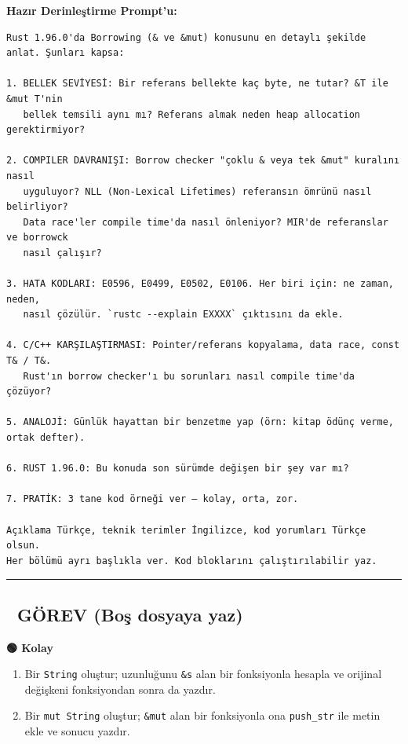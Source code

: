 \documentclass[12pt,a4paper]{article}
\begin{document}
\textbf{Hazır Derinleştirme Prompt'u:}

\begin{verbatim}
Rust 1.96.0'da Borrowing (& ve &mut) konusunu en detaylı şekilde anlat. Şunları kapsa:

1. BELLEK SEVİYESİ: Bir referans bellekte kaç byte, ne tutar? &T ile &mut T'nin
   bellek temsili aynı mı? Referans almak neden heap allocation gerektirmiyor?

2. COMPILER DAVRANIŞI: Borrow checker "çoklu & veya tek &mut" kuralını nasıl
   uyguluyor? NLL (Non-Lexical Lifetimes) referansın ömrünü nasıl belirliyor?
   Data race'ler compile time'da nasıl önleniyor? MIR'de referanslar ve borrowck
   nasıl çalışır?

3. HATA KODLARI: E0596, E0499, E0502, E0106. Her biri için: ne zaman, neden,
   nasıl çözülür. `rustc --explain EXXXX` çıktısını da ekle.

4. C/C++ KARŞILAŞTIRMASI: Pointer/referans kopyalama, data race, const T& / T&.
   Rust'ın borrow checker'ı bu sorunları nasıl compile time'da çözüyor?

5. ANALOJİ: Günlük hayattan bir benzetme yap (örn: kitap ödünç verme, ortak defter).

6. RUST 1.96.0: Bu konuda son sürümde değişen bir şey var mı?

7. PRATİK: 3 tane kod örneği ver — kolay, orta, zor.

Açıklama Türkçe, teknik terimler İngilizce, kod yorumları Türkçe olsun.
Her bölümü ayrı başlıkla ver. Kod bloklarını çalıştırılabilir yaz.
\end{verbatim}

\begin{center}\rule{0.5\linewidth}{0.5pt}\end{center}

\subsection{📝 GÖREV (Boş dosyaya yaz)}\label{görev-boş-dosyaya-yaz-10}

\textbf{🟢 Kolay}

\begin{enumerate}
\def\labelenumi{\arabic{enumi}.}
\tightlist
\item
  Bir \texttt{String} oluştur; uzunluğunu \texttt{\&s} alan bir fonksiyonla hesapla ve orijinal değişkeni fonksiyondan sonra da yazdır.
\item
  Bir \texttt{mut\ String} oluştur; \texttt{\&mut} alan bir fonksiyonla ona \texttt{push\_str} ile metin ekle ve sonucu yazdır.
\end{enumerate}
\end{document}
